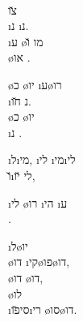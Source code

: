   \\
\u{צו}  \\
\i{נ} \i{נ}.\\
\i{ע} \o{מו} \u{ו}\\
 \o{או} .

\o{כ} \o{יו} \i{ע}\o{רו}  \\
\i{נ} \u{חו}.\\
\o{כ} \o{יו} \\
\i{נ} .

\i{ל}\i{מי}, \i{לי} \i{מי}\i{לי}\\
\u{ו}\i{לי}  \u{יו},

\i{לי} \o{רו} \i{הי} \i{ע} \\
 .

\i{ל}\o{יו}  \\
 \o{דו} \i{קי}\o{פו}\o{דו},\\
\o{דו} \o{דו},\\
\o{לו}  \\
\i{סי}\u{פו}\i{רי} \o{סו}\o{דו}.
